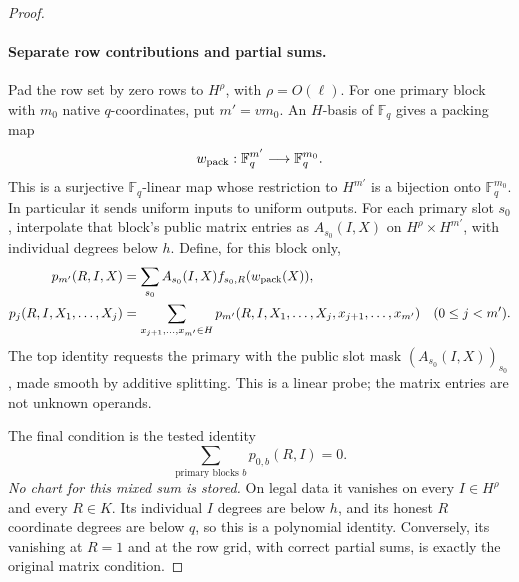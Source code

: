 \begin{proof}
\paragraph{Separate row contributions and partial sums.}
Pad the row set by zero rows to $H^\rho$, with $\rho=O(\ell)$.
For one primary block with $m_0$ native $q$-coordinates, put $m'=vm_0$.
An $H$-basis of $\mathbb F_q$ gives a packing map
\[
 w_{\rm pack}:\mathbb F_q^{m'}\longrightarrow\mathbb F_q^{m_0}.
\]
This is a surjective $\mathbb F_q$-linear map whose restriction to
$H^{m'}$ is a bijection onto $\mathbb F_q^{m_0}$.  In particular it
sends uniform inputs to uniform outputs.  For each primary slot $s_0$,
interpolate that block's public matrix entries as
$A_{s_0}(I,X)$ on $H^\rho\times H^{m'}$, with individual degrees below
$h$.  Define, for this block only,
\begin{align}
 p_{m'}(R,I,X)
   &=\sum_{s_0}A_{s_0}(I,X)
                 f_{s_0,R}(w_{\rm pack}(X)),       \label{ia:linear-top}\\
 p_j(R,I,X_1,\ldots,X_j)
   &=\sum_{x_{j+1},\ldots,x_{m'}\in H}
      p_{m'}(R,I,X_1,\ldots,X_j,x_{j+1},\ldots,x_{m'})
      \quad(0\le j<m').                           \label{ia:partial-sums}
\end{align}
The top identity requests the primary with the public slot mask
$(A_{s_0}(I,X))_{s_0}$, made smooth by additive splitting.  This is a
linear probe; the matrix entries are not unknown operands.

The final condition is the tested identity
\begin{equation}
 \sum_{\text{primary blocks }b} p_{0,b}(R,I)=0.
                                                               \label{ia:final-row-sum}
\end{equation}
\emph{No chart for this mixed sum is stored.}  On legal data it
vanishes on every $I\in H^\rho$ and every $R\in K$.  Its individual
$I$ degrees are below $h$, and its honest $R$ coordinate degrees are
below $q$, so this is a polynomial identity.  Conversely, its
vanishing at $R=1$ and at the row grid, with correct partial sums,
is exactly the original matrix condition.


\end{proof}
